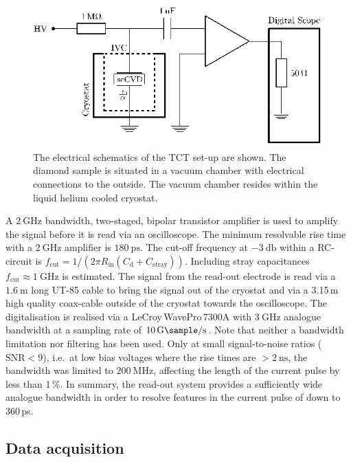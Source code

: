 \begin{figure}[t]
  \includegraphics[width=0.45\linewidth]{./figures/circuit2}

   \caption{The electrical schematics of the TCT set-up are shown. 
   The diamond sample is situated in a vacuum chamber with electrical connections to the outside. 
   The vacuum chamber resides within the liquid helium cooled  cryostat.}
   \label{fig:SETUPtct2}
\end{figure}

A $\SI{2}{\giga\hertz}$ bandwidth, two-staged, bipolar transistor amplifier %
 is used to amplify the signal before it is read via an oscilloscope. 
The minimum resolvable rise time with a $\SI{2}{\giga\hertz}$ amplifier is $\SI{180}{\pico\second}$. 
The cut-off frequency at $\SI{-3}{\decibel}$ within a RC-circuit is $f_{\textrm{cut}} = 1/(2\pi R_{\textrm{in}} \left( C_{\textrm{d}}+C_{\textrm{stray}}\right))$. 
Including stray capacitances $f_{\textrm{cut}}\approx \SI{1}{\giga\hertz}$ is estimated. 
The signal from the read-out electrode is read via a $\SI{1.6}{\meter}$ long UT-85 cable to bring the signal out of the cryostat and via a 3.15\,m high quality coax-cable outside of the cryostat
 towards the oscilloscope.
The digitalisation is realised via a LeCroy\,WavePro\,7300A with $\SI{3}{\giga\hertz}$ analogue bandwidth at a sampling rate of $\SI{10}{\giga\sample/\second}$. 
Note that neither a bandwidth limitation nor filtering has been used. 
Only at small signal-to-noise ratios ($\textrm{SNR}<9$), i.e.~at low bias voltages where the rise times are $> \SI{2}{\nano\second}$, the bandwidth was limited to $\SI{200}{\mega\hertz}$,
 affecting the length of the current pulse by less than 1\,\%. 
In summary, the read-out system provides a sufficiently wide analogue bandwidth in order to resolve features in the current pulse of down to 360\,ps. 






\subsection{Data acquisition}

